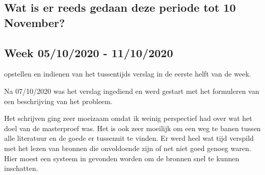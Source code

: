 \documentclass{article}
\begin{document}
\subsection{Wat is er reeds gedaan deze periode tot 10 November?}



\subsection{Week 05/10/2020 - 11/10/2020}

opstellen en indienen van het tussentijds verslag in de eerste helft van de week.

Na 07/10/2020 was het verslag ingediend en werd gestart met het formuleren van een beschrijving van het probleem.

Het schrijven ging zeer moeizaam omdat ik weinig perspectief had over wat het doel van de masterproef was. Het is ook zeer moeilijk om een weg te banen tussen alle literatuur en de goede er tussenuit te vinden. Er werd heel wat tijd verspild met het lezen van bronnen die onvoldoende zijn of net niet goed genoeg waren. Hier moest een systeem in gevonden worden om de bronnen snel te kunnen inschatten. 
\end{document}
